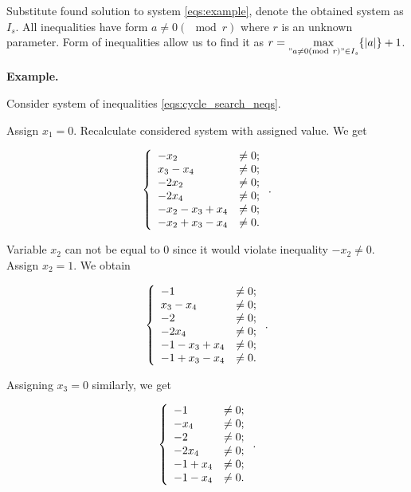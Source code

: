 \documentclass[14pt]{mmcs-article}
\begin{document}
Substitute found solution to system \eqref{eqs:example}, denote the obtained system as $I_s$. All inequalities have form $a \neq 0 (\mod{r})$ where $r$ is an unknown parameter. Form of inequalities allow us to find it as $r = \max\limits_{"a \neq 0 (\mod{r})" \in I_s}\{ |a| \} + 1$.

\textbf{Example.}

Consider system of inequalities \eqref{eqs:cycle_search_neqs}.

Assign $x_1 = 0$. Recalculate considered system with assigned value. We get

\begin{equation}
    \centering
    \left\{
        \begin{array}{ll}
            - x_2 &\neq 0            ; \\
            x_3 - x_4 &\neq 0        ; \\
            - 2 x_2 &\neq 0          ; \\
            - 2 x_4 &\neq 0          ; \\
            - x_2 - x_3 + x_4 &\neq 0; \\
            - x_2 + x_3 - x_4 &\neq 0. \\
        \end{array}
    \right..
    \label{eqs:cycle_search_neqs_1}
\end{equation}

Variable $x_2$ can not be equal to $0$ since it would violate inequality $- x_2 \neq 0$. Assign $x_2 = 1$. We obtain

\begin{equation}
    \centering
    \left\{
        \begin{array}{ll}
            - 1 &\neq 0             ; \\
            x_3 - x_4 &\neq 0       ; \\
            - 2 &\neq 0             ; \\
            - 2 x_4 &\neq 0         ; \\
            - 1 - x_3 + x_4 &\neq 0 ; \\
            - 1 + x_3 - x_4 &\neq 0 . \\
        \end{array}
    \right..
    \label{eqs:cycle_search_neqs_2}
\end{equation}

Assigning $x_3 = 0$ similarly, we get

\begin{equation}
    \centering
    \left\{
        \begin{array}{ll}
            - 1 &\neq 0       ; \\
            - x_4 &\neq 0     ; \\
            - 2 &\neq 0       ; \\
            - 2 x_4 &\neq 0   ; \\
            - 1 + x_4 &\neq 0 ; \\
            - 1 - x_4 &\neq 0 . \\
        \end{array}
    \right..
    \label{eqs:cycle_search_neqs_3}
\end{equation}
\end{document}
